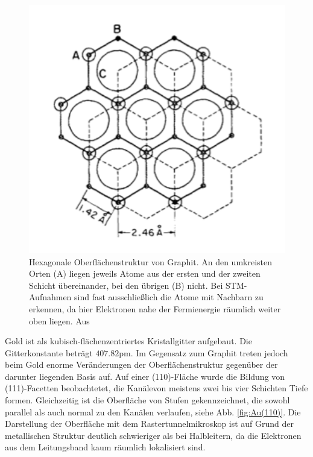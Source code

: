 \begin{figure}
    \includegraphics[width=1.0\textwidth]{pics/graphite}
    \caption{Hexagonale Oberflächenstruktur von Graphit. An den umkreisten Orten (A) 
liegen jeweils Atome aus der ersten und der zweiten Schicht übereinander, bei den 
übrigen (B) nicht. Bei STM-Aufnahmen sind fast ausschließlich die Atome mit Nachbarn 
zu erkennen, da hier Elektronen nahe der Fermienergie räumlich weiter oben liegen. 
Aus \cite{park1986tunneling}}
    \label{fig:graphite}
\end{figure} 

Gold ist als kubisch-flächenzentriertes Kristallgitter aufgebaut. Die Gitterkonstante 
beträgt $407.82\mathrm{pm}$\cite{ohring1995engineering}. Im Gegensatz zum Graphit 
treten jedoch beim Gold enorme Veränderungen der Oberflächenstruktur gegenüber der 
darunter liegenden Basis auf. Auf einer (110)-Fläche wurde die Bildung von 
(111)-Facetten beobachtetet, die Kanälevon meistens zwei bis vier Schichten Tiefe 
formen. Gleichzeitig ist die Oberfläche von Stufen gekennzeichnet, die sowohl parallel 
als auch normal zu den Kanälen verlaufen, siehe Abb. \ref{fig:Au(110)}. Die Darstellung 
der Oberfläche mit dem Rastertunnelmikroskop ist auf Grund der metallischen Struktur 
deutlich schwieriger als bei Halbleitern, da die Elektronen aus dem Leitungsband kaum 
räumlich lokalisiert sind. 

